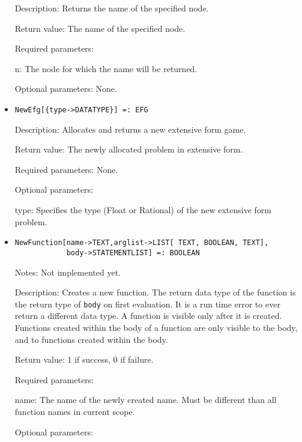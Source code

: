 \begin{itemize}
\bd
\item
[Description:] Returns the name of the specified node.
\item
[Return value:] The name of the specified node.
\item
[Required parameters:]\hfil\null

\bd
\item
[n:] The node for which the name will be returned.
\ed

\item
[Optional parameters:] None.
\ed

\item
\protect \large \begin{verbatim}
NewEfg[{type->DATATYPE}] =: EFG
\end{verbatim}\normalsize

\bd
\item
[Description:] Allocates and returns a new extensive form game.
\item
[Return value:] The newly allocated problem in extensive form.
\item
[Required parameters:] None.
\item
[Optional parameters:]\hfil\null

\bd
\item
[type:] Specifies the type (Float or Rational) of the new extensive
form problem.
\ed
\ed

\item
\protect \large \begin{verbatim}
NewFunction[name->TEXT,arglist->LIST[ TEXT, BOOLEAN, TEXT], 
            body->STATEMENTLIST] =: BOOLEAN
\end{verbatim}\normalsize

\bd
\item [Notes:] Not implemented yet.  
\item
[Description:] Creates a new function.  The return data type of the
function is the return type of \verb+body+ on first evaluation.  It is
a run time error to ever return a different data type.  A function is
visible only after it is created.  Functions created within the body
of a function are only visible to the body, and to functions created
within the body.
\item
[Return value:] 1 if success, 0 if failure.  
\item
[Required parameters:]
\bd
\item[name:] The name of the newly created name.  Must be different
than all function names in current scope.  
\ed
\item
[Optional parameters:]\hfil\null


\end{itemize}
